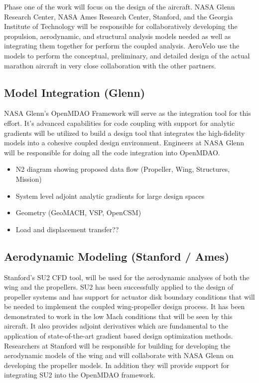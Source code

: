 \documentclass[]{aiaa-tc}
\begin{document}
    Phase one of the work will focus on the design of the aircraft. NASA Glenn Research Center, 
    NASA Ames Research Center, Stanford, and the Georgia Institute of Technology will be responsible 
    for collaboratively developing the propulsion, aerodynamic, and structural analysis 
    models needed as well as integrating them together for perform the coupled analysis. AeroVelo 
    use the models to perform the conceptual, preliminary, and detailed design of the actual marathon 
    aircraft in very close collaboration with the other partners. 

    \subsection{Model Integration (Glenn)}

    NASA Glenn's OpenMDAO Framework will serve as the integration tool for this effort. It's advanced 
    capabilities for code coupling with support for analytic gradients will be utilized to build 
    a design tool that integrates the high-fidelity models into a cohesive coupled design environment. 
    Engineers at NASA Glenn will be responsible for doing all the code integration into OpenMDAO. 

    \begin{itemize}
        \item N2 diagram showing proposed data flow (Propeller, Wing, Structures, Mission)
        \item System level adjoint analytic gradients for large design spaces
        \item Geometry (GeoMACH, VSP, OpenCSM)
        \item Load and displacement transfer?? 
    \end{itemize}

    

    \subsection{Aerodynamic Modeling (Stanford / Ames)}

    Stanford's SU2 CFD tool, will be used for the aerodynamic analyses of both the wing and 
    the propellers. SU2 has been successfully applied to the design of propeller systems 
    and has support for actuator disk boundary conditions that will be needed to implement 
    the coupled wing­-propeller design process. It has been demonstrated to work in the low 
    Mach conditions that will be seen by this aircraft. It also provides adjoint derivatives 
    which are fundamental to the application of state­-of-­the-­art gradient based design 
    optimization methods. Researchers at Stanford will be responsible for building for developing 
    the aerodynamic models of the wing and will collaborate with NASA Glenn on developing the 
    propeller models. In addition they will provide support for integrating SU2 into the OpenMDAO 
    framework. 
\end{document}
